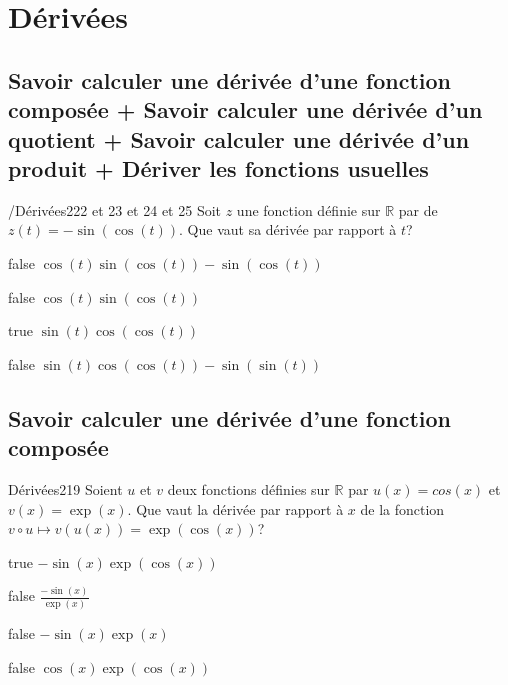 \documentclass[11pt]{article}
\begin{document}
       
            
	\section{Dérivées}
				 \subsection{Savoir calculer une dérivée d'une fonction composée + Savoir calculer une dérivée d'un quotient + Savoir calculer une dérivée d'un produit + Dériver les fonctions usuelles}

            \begin{question}{/}{Dérivées}{2}{22 et 23 et 24 et 25}
                Soit $z$ une fonction définie sur $\mathbb{R}$ par de $z(t)=-\sin(\cos(t))$. Que vaut sa dérivée par rapport à $t$?
            \end{question}

            \begin{reponses}
                \item[false] $\cos(t)\sin(\cos(t))-\sin(\cos(t))$
                \item[false] $\cos(t)\sin(\cos(t))$
                \item[true] $\sin(t)\cos(\cos(t))$
                \item[false] $\sin(t)\cos(\cos(t))-\sin(\sin(t))$
            \end{reponses}
            
             \subsection{Savoir calculer une dérivée d'une fonction composée}
        

        	\begin{question}{25}{Dérivées}{2}{19}
				Soient $u$ et $v$ deux fonctions définies sur $\mathbb{R}$ par $u(x) = cos(x)$ et $v(x) = \exp(x)$. Que vaut la dérivée par rapport à $x$ de la fonction $v\circ u \mapsto v(u(x)) = \exp(\cos(x))$?
            \end{question}

            \begin{reponses}
            	\item[true] $-\sin(x)\exp(\cos(x))$
            	\item[false] $\frac{-\sin(x)}{\exp(x)}$
                \item[false] $-\sin(x)\exp(x)$
                \item[false] $\cos(x)\exp(\cos(x))$
            \end{reponses}
			
\end{document}
